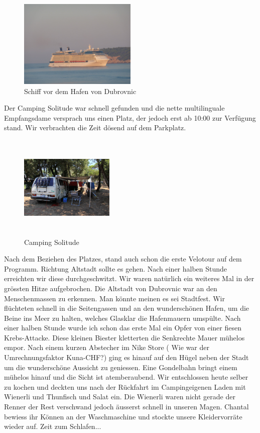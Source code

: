 \begin{figure}[H]
    \centering
    \includegraphics[width=0.5\textwidth]{../Bilder/Sommer2012/63.jpg}
    \caption{Schiff vor dem Hafen von Dubrovnic}
    \label{img:Sommer6}
\end{figure}


Der Camping Solitude war schnell gefunden und die nette multilinguale Empfangsdame versprach uns einen Platz, der jedoch erst ab 10:00 zur Verfügung stand.
Wir verbrachten die Zeit dösend auf dem Parkplatz.

\begin{figure} 
  \begin{centering}
    \includegraphics[width=0.4\textwidth, height=5cm, keepaspectratio]{../Bilder/Sommer2012/64.jpg}
    \caption{Camping Solitude}
  \end{centering}
\end{figure} 

Nach dem Beziehen des Platzes, stand auch schon die erste Velotour auf dem Programm.
Richtung Altstadt sollte es gehen.
Nach einer halben Stunde erreichten wir diese durchgeschwitzt.
Wir waren natürlich ein weiteres Mal in der grössten Hitze aufgebrochen.
Die Altstadt von Dubrovnic war an den Menschenmassen zu erkennen.
Man könnte meinen es sei Stadtfest.
Wir flüchteten schnell in die Seitengassen und an den wunderschönen Hafen, um die Beine ins Meer zu halten, welches Glasklar die Hafenmauern umspülte.
Nach einer halben Stunde wurde ich schon das erste Mal ein Opfer von einer fiesen Krebs-Attacke.
Diese kleinen Biester kletterten die Senkrechte Mauer mühelos empor.
Nach einem kurzen Abstecher im Nike Store ( Wie war der Umrechnungsfaktor Kuna-CHF?) ging es hinauf auf den Hügel neben der Stadt um die wunderschöne Aussicht zu geniessen.
Eine Gondelbahn bringt einem mühelos hinauf und die Sicht ist atemberaubend.
Wir entschlossen heute selber zu kochen und deckten uns nach der Rückfahrt im Campingeigenen Laden mit Wienerli und Thunfisch und Salat ein.
Die Wienerli waren nicht gerade der Renner der Rest verschwand jedoch äusserst schnell in unseren Magen.
Chantal bewiess ihr Können an der Waschmaschine und stockte unsere Kleidervorräte wieder auf. Zeit zum Schlafen...

